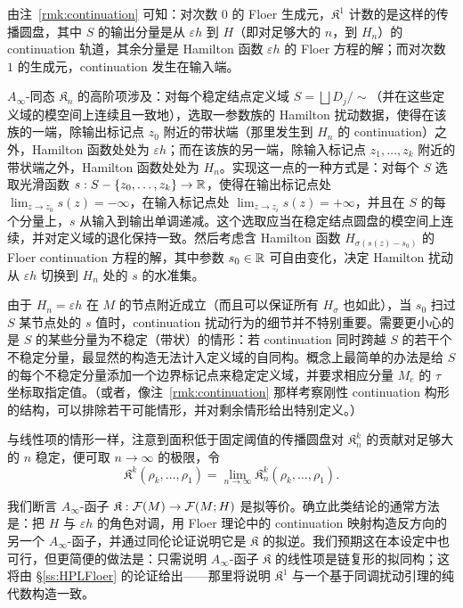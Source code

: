 由注~\ref{rmk:continuation} 可知：对次数 $0$ 的 Floer 生成元，$\mathfrak{K}^1$ 计数的是这样的传播圆盘，其中 $S$ 的输出分量是从 $\varepsilon h$ 到 $H$（即对足够大的 $n$，到 $H_n$）的 continuation 轨道，其余分量是 Hamilton 函数 $\varepsilon h$ 的 Floer 方程的解；而对次数 $1$ 的生成元，continuation 发生在输入端。

$A_\infty$-同态 $\mathfrak{K}_n$ 的高阶项涉及：对每个稳定结点定义域 $S=\bigsqcup D_j/\!\sim$（并在这些定义域的模空间上连续且一致地），选取一参数族的 Hamilton 扰动数据，使得在该族的一端，除输出标记点 $z_0$ 附近的带状端（那里发生到 $H_n$ 的 continuation）之外，Hamilton 函数处处为 $\varepsilon h$；而在该族的另一端，除输入标记点 $z_1,\dots,z_k$ 附近的带状端之外，Hamilton 函数处处为 $H_n$。实现这一点的一种方式是：对每个 $S$ 选取光滑函数 $s:S-\{z_0,\dots,z_k\}\to\mathbb{R}$，使得在输出标记点处 $\lim_{z\to z_0}s(z)=-\infty$，在输入标记点处 $\lim_{z\to z_i}s(z)=+\infty$，并且在 $S$ 的每个分量上，$s$ 从输入到输出单调递减。这个选取应当在稳定结点圆盘的模空间上连续，并对定义域的退化保持一致。然后考虑含 Hamilton 函数 $H_{\sigma(s(z)-s_0)}$ 的 Floer continuation 方程的解，其中参数 $s_0\in\mathbb{R}$ 可自由变化，决定 Hamilton 扰动从 $\varepsilon h$ 切换到 $H_n$ 处的 $s$ 的水准集。

由于 $H_n=\varepsilon h$ 在 $M$ 的节点附近成立（而且可以保证所有 $H_\sigma$ 也如此），当 $s_0$ 扫过 $S$ 某节点处的 $s$ 值时，continuation 扰动行为的细节并不特别重要。需要更小心的是 $S$ 的某些分量为不稳定（带状）的情形：若 continuation 同时跨越 $S$ 的若干个不稳定分量，最显然的构造无法计入定义域的自同构。概念上最简单的办法是给 $S$ 的每个不稳定分量添加一个边界标记点来稳定定义域，并要求相应分量 $M_e$ 的 $\tau$ 坐标取指定值。（或者，像注~\ref{rmk:continuation} 那样考察刚性 continuation 构形的结构，可以排除若干可能情形，并对剩余情形给出特别定义。）

与线性项的情形一样，注意到面积低于固定阈值的传播圆盘对 $\mathfrak{K}_n^k$ 的贡献对足够大的 $n$ 稳定，便可取 $n\to\infty$ 的极限，令
\[
\mathfrak{K}^k(\rho_k,\dots,\rho_1)=\lim_{n\to \infty} \mathfrak{K}^k_n(\rho_k,\dots,\rho_1).
\]

我们断言 $A_\infty$-函子 $\mathfrak{K}:\mathcal{F}(M)\to\mathcal{F}(M;H)$ 是拟等价。确立此类结论的通常方法是：把 $H$ 与 $\varepsilon h$ 的角色对调，用 Floer 理论中的 continuation 映射构造反方向的另一个 $A_\infty$-函子，并通过同伦论证说明它是 $\mathfrak{K}$ 的拟逆。我们预期这在本设定中也可行，但更简便的做法是：只需说明 $A_\infty$-函子 $\mathfrak{K}$ 的线性项是链复形的拟同构；这将由 §\ref{ss:HPLFloer} 的论证给出——那里将说明 $\mathfrak{K}^1$ 与一个基于同调扰动引理的纯代数构造一致。
